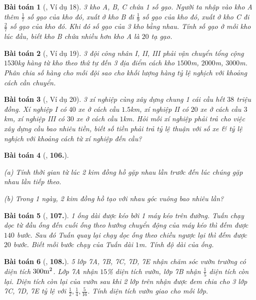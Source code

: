 \documentclass{article}
\numberwithin{equation}{section}
\newtheorem{baitoan}{Bài toán}
\begin{document}
\begin{baitoan}[\cite{Binh_Toan_7_tap_1}, Ví dụ 18]
	3 kho A, B, C chứa 1 số gạo. Người ta nhập vào kho A thêm $\frac{1}{7}$ số gạo của kho đó, xuất ở kho B đi $\frac{1}{9}$ số gạo của kho đó, xuất ở kho C đi $\frac{2}{7}$ số gạo của kho đó. Khi đó số gạo của 3 kho bằng nhau. Tính số gạo ở mỗi kho lúc đầu, biết kho B chứa nhiều hơn kho A là $20$ tạ gạo.
\end{baitoan}

\begin{baitoan}[\cite{Binh_Toan_7_tap_1}, Ví dụ 19]
	3 đội công nhân I, II, III phải vận chuyển tổng cộng $1530$\emph{kg} hàng từ kho theo thứ tự đến 3 địa điểm cách kho $1500$\emph{m}, $2000$\emph{m}, $3000$\emph{m}. Phân chia số hàng cho mỗi đội sao cho khối lượng hàng tỷ lệ nghịch với khoảng cách cần chuyển.
\end{baitoan}

\begin{baitoan}[\cite{Binh_Toan_7_tap_1}, Ví dụ 20]
	3 xí nghiệp cùng xây dựng chung 1 cái cầu hết $38$ triệu đồng. Xí nghiệp I có $40$ xe ở cách cầu $1.5$\emph{km}, xí nghiệp II có $20$ xe ở cách cầu $3$\emph{km}, xí nghiệp III có $30$ xe ở cách cầu $1$\emph{km}. Hỏi mỗi xí nghiệp phải trả cho việc xây dựng cầu bao nhiêu tiền, biết số tiền phải trả tỷ lệ thuận với số xe \& tỷ lệ nghịch với khoảng cách từ xí nghiệp đến cầu?
\end{baitoan}

\begin{baitoan}[\cite{Binh_Toan_7_tap_1}, \textbf{106.}]
	\begin{enumerate*}
		\item[(a)] Tính thời gian từ lúc 2 kim đồng hồ gặp nhau lần trước đến lúc chúng gặp nhau lần tiếp theo.
		\item[(b)] Trong 1 ngày, 2 kim đồng hồ tạo với nhau góc vuông bao nhiêu lần?
	\end{enumerate*}
\end{baitoan}

\begin{baitoan}[\cite{Binh_Toan_7_tap_1}, \textbf{107.}]
	1 ống dài được kéo bởi 1 máy kéo trên đường. Tuấn chạy dọc từ đầu ống đến cuối ống theo hướng chuyển động của máy kéo thì đếm được $140$ bước. Sau đó Tuấn quay lại chạy dọc ống theo chiều ngược lại thì đếm được $20$ bước. Biết mỗi bước chạy của Tuấn dài $1$\emph{m}. Tính độ dài của ống.
\end{baitoan}

\begin{baitoan}[\cite{Binh_Toan_7_tap_1}, \textbf{108.}]
	5 lớp 7A, 7B, 7C, 7D, 7E nhận chăm sóc vườn trường có diện tích $300\rm m^2$. Lớp 7A nhận $15$\% diện tích vườn, lớp 7B nhận $\frac{1}{5}$ diện tích còn lại. Diện tích còn lại của vườn sau khi 2 lớp trên nhận được đem chia cho 3 lớp 7C, 7D, 7E tỷ lệ với $\frac{1}{2},\frac{1}{4},\frac{5}{16}$. Tính diện tích vườn giao cho mỗi lớp.
\end{baitoan}
\end{document}
